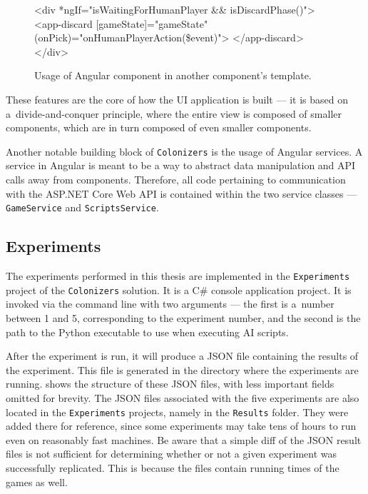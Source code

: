 \begin{figure}[ht]
\begin{code}[commandchars=\\\{\},codes={\catcode`\$=3\catcode`\^=7\catcode`\_=8}]
<div *ngIf="isWaitingForHumanPlayer && isDiscardPhase()">
    <app-discard [gameState]="gameState"
                 (onPick)="onHumanPlayerAction(\$event)">
    </app-discard>
</div>
\end{code}
\caption{Usage of Angular component in another component's template.}\label{dd:componentref}
\end{figure}

These features are the core of how the UI application is built --- it is based on
a~divide-and-conquer principle, where the entire view is composed of smaller components,
which are in turn composed of even smaller components.

Another notable building block of \texttt{Colonizers} is the usage of Angular
services. A service in Angular is meant to be a way to abstract data manipulation
and API calls away from components. Therefore, all code pertaining to
communication with the ASP.NET Core Web API is contained within
the two service classes --- \texttt{GameService} and \texttt{ScriptsService}.

\subsection{Experiments}
\label{chap:experimentdocs}

The experiments performed in this thesis are implemented in the \texttt{Experiments}
project of the \texttt{Colonizers} solution. It is a C\# console application project.
It is invoked via the command line with two arguments --- the first is a~number
between 1 and 5, corresponding to the experiment number, and the second
is the path to the Python executable to use when executing AI scripts.

After the experiment is run, it will produce a JSON file containing the results
of the experiment. This file is generated in the directory where the experiments
are running.
 shows the structure of these JSON files, with less
important fields omitted for brevity. The JSON files associated with the five
experiments are also located in the \texttt{Experiments} projects, namely in
the \texttt{Results} folder. They were added there for reference, since
some experiments may take tens of hours to run even on reasonably fast
machines. Be aware that a simple diff of the JSON result files
is not sufficient for determining whether or not a given experiment was successfully
replicated. This is because the files contain running times of the games as well.

